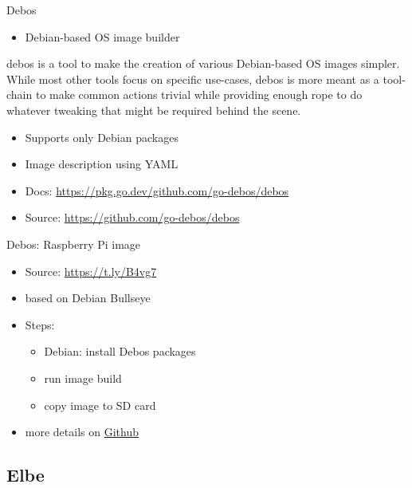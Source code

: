 \documentclass{beamer}
\begin{document}
\begin{frame}{Debos}
	\begin{itemize}
		\item Debian-based OS image builder
	\end{itemize}
	\begin{definition} 
		debos is a tool to make the creation of various Debian-based OS images simpler. While most other tools focus on specific use-cases, debos is more meant as a tool-chain to make common actions trivial while providing enough rope to do whatever tweaking that might be required behind the scene.
	\end{definition}
	\begin{itemize}
		\item Supports only Debian packages
		\item Image description using YAML
		\item Docs: \url{https://pkg.go.dev/github.com/go-debos/debos}
		\item Source: \url{https://github.com/go-debos/debos}
	\end{itemize}
\end{frame}

\begin{frame}{Debos: Raspberry Pi image}
	\begin{itemize}
		\item Source: \url{https://t.ly/B4vg7}
		\item based on Debian Bullseye
		\item Steps:
		\begin{itemize}
			\item Debian: install Debos packages
			\item run image build
			\item copy image to SD card
		\end{itemize}
		\item more details on \href{https://github.com/tomirgang/eh21_maintainable_linux/tree/main/examples/first_build_rpi4/debos}{Github}
	\end{itemize}
\end{frame}

\subsection{Elbe}
\end{document}
